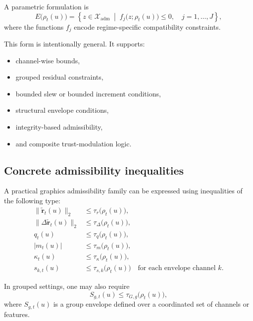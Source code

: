 \documentclass[11pt,letterpaper]{article}
\theoremstyle{gcresult}
\theoremstyle{definition}
\begin{document}
A parametric formulation is
\begin{equation}
E\bigl(\rho_t(u)\bigr)
=
\left\{
z \in \mathcal X_{\mathrm{adm}}
\;\middle|\;
f_j\!\bigl(z;\rho_t(u)\bigr)\le 0,\quad j=1,\dots,J
\right\},
\end{equation}
where the functions $f_j$ encode regime-specific compatibility constraints.

This form is intentionally general. It supports:
\begin{itemize}[leftmargin=1.5em]
    \item channel-wise bounds,
    \item grouped residual constraints,
    \item bounded slew or bounded increment conditions,
    \item structural envelope conditions,
    \item integrity-based admissibility,
    \item and composite trust-modulation logic.
\end{itemize}


\subsection{Concrete admissibility inequalities}

A practical graphics admissibility family can be expressed using inequalities of the following type:
\begin{align}
\|\tilde{\mathbf r}_t(u)\|_2 &\le \tau_r\bigl(\rho_t(u)\bigr), \\
\|\Delta \tilde{\mathbf r}_t(u)\|_2 &\le \tau_\Delta\bigl(\rho_t(u)\bigr), \\
q_t(u) &\le \tau_q\bigl(\rho_t(u)\bigr), \\
|m_t(u)| &\le \tau_m\bigl(\rho_t(u)\bigr), \\
\kappa_t(u) &\le \tau_\kappa\bigl(\rho_t(u)\bigr), \\
s_{k,t}(u) &\le \tau_{s,k}\bigl(\rho_t(u)\bigr)\quad \text{for each envelope channel }k.
\end{align}

In grouped settings, one may also require
\begin{equation}
S_{g,t}(u)\le \tau_{G,g}\bigl(\rho_t(u)\bigr),
\end{equation}
where $S_{g,t}(u)$ is a group envelope defined over a coordinated set of channels or features.
\end{document}
